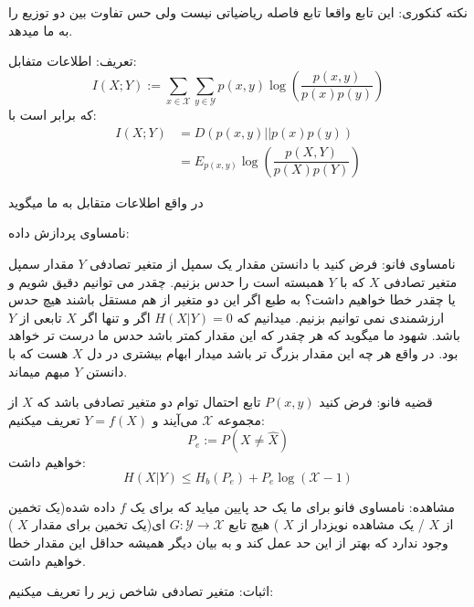 نکته کنکوری: این تابع واقعا تابع فاصله ریاضیاتی نیست ولی حس تفاوت بین دو توزیع را به ما میدهد.

تعریف: اطلاعات متفابل:
$$I(X; Y) := \sum_{x \in \mathcal{X}} \sum_{y \in \mathcal{Y}} p(x, y) \log(\dfrac{p(x, y)}{p(x)p(y)})$$
که برابر است با:
\begin{align*}
    I(X;Y) &= D(p(x, y) || p(x)p(y))
    \\
    &= E_{p(x, y)} \log(\dfrac{p(X, Y)}{p(X)p(Y)})
\end{align*}

در واقع اطلاعات متقابل به ما میگوید

نامساوی پردازش داده:


نامساوی فانو: فرض کنید با دانستن مقدار یک سمپل از متغیر تصادفی
$Y$
مقدار سمپل متغیر تصادفی
$X$
که با
$Y$
همبسته است را حدس بزنیم. چقدر می توانیم دقیق شویم و یا چقدر خطا خواهیم داشت؟ به طبع اگر این دو متغیر از هم مستقل باشند هیچ حدس ارزشمندی نمی توانیم بزنیم. میدانیم که
$H(X|Y) = 0$
اگر و تنها اگر
$X$
تابعی از
$Y$
باشد. شهود ما میگوید که هر چقدر که این مقدار کمتر باشد حدس ما درست تر خواهد بود. در واقع هر چه این مقدار بزرگ تر باشد میدار ابهام بیشتری در دل
$X$
هست که با دانستن
$Y$
مبهم میماند.

قضیه فانو: فرض کنید
$P(x, y)$
تابع احتمال توام دو متغیر تصادفی باشد که
$X$
از مجموعه
$\mathcal{X}$
می‌آیند و
$Y = f(X)$
تعریف میکنیم:
$$P_e := P(X \neq \hat{X})$$
خواهیم داشت:
$$H(X|Y) \leq H_b(P_e) + P_e \log(\mathcal{X} - 1)$$


مشاهده: نامساوی فانو برای ما یک حد پایین میاید که برای یک
$f$
داده شده(یک تخمین از
$X$
/ یک مشاهده نویزدار از
$X$
) هیچ تابع
$G:\mathcal{Y} \rightarrow \mathcal{X}$
ای(یک تخمین برای مقدار
$X$
) وجود ندارد که بهتر از این حد عمل کند و به بیان دیگر همیشه حداقل این مقدار خطا خواهیم داشت.

اثبات:
متغیر تصادفی شاخص زیر را تعریف میکنیم:

